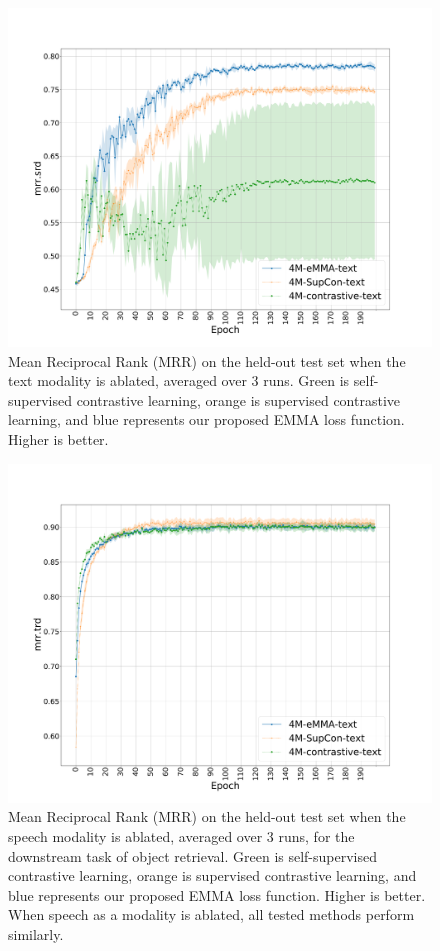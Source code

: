 \documentclass[sigconf,natbib=true,anonymous=true]{acmart}
\begin{document}
\begin{figure}[tbh]
\centering
\includegraphics[width=.99\columnwidth]{Figures/average-seeds-epochs-mrr_ard.pdf}
\caption{Mean Reciprocal Rank (MRR) on the held-out test set when the text modality is ablated, averaged over 3 runs. Green is self-supervised contrastive learning, orange is supervised contrastive learning, and blue represents our proposed EMMA loss function. Higher is better.
}
\label{fig:epochs-mrr.srd}
\end{figure}

\begin{figure}[tbh]
\centering
\includegraphics[width=.99\columnwidth]{Figures/average-seeds-epochs-mrr_lrd.pdf}
\caption{Mean Reciprocal Rank (MRR) on the held-out test set when the speech modality is ablated, averaged over 3 runs, for the downstream task of object retrieval. Green is self-supervised contrastive learning, orange is supervised contrastive learning, and blue represents our proposed EMMA loss function. Higher is better. When speech as a modality is ablated, all tested methods perform similarly.
}
\label{fig:epochs-mrr.trd}
\end{figure}
\end{document}
